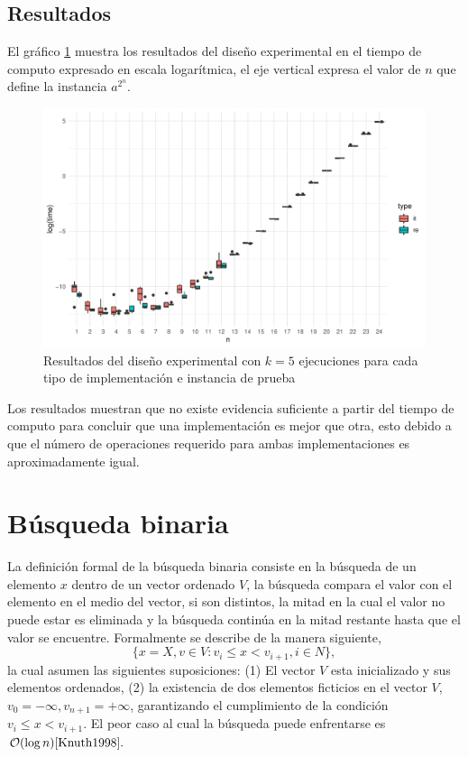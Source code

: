 \documentclass[letterpaper,11pt]{article}
\begin{document}
\subsection{Resultados}
El gráfico \ref{fig:ie} muestra los resultados del diseño experimental en el tiempo de computo expresado en escala logarítmica, el eje vertical expresa el valor de $n$ que define la instancia $a^{2^n}$.

\begin{figure}[h!]
  \includegraphics[width=\linewidth]{ie.pdf}
  \caption{Resultados del diseño experimental con $k=5$ ejecuciones para cada tipo de implementación e instancia de prueba}
  \label{fig:ie}
\end{figure}

Los resultados muestran que no existe evidencia suficiente a partir del tiempo de computo para concluir que una implementación es mejor que otra, esto debido a que el número de operaciones requerido para ambas implementaciones es aproximadamente igual.

\section{Búsqueda binaria}

La definición formal de la búsqueda binaria consiste en la búsqueda de un elemento $x$ dentro de un vector ordenado $V$,  la búsqueda compara el valor con el elemento en el medio del vector, si son distintos, la mitad en la cual el valor no puede estar es eliminada y la búsqueda continúa en la mitad restante hasta que el valor se encuentre. Formalmente se describe de la manera siguiente,
\begin{equation}
\{ x= X, v \in V: v_i \leq x < v_{i+1}, i\in N \}, 
\end{equation}
la cual asumen las siguientes suposiciones: (1) El vector $V$ esta inicializado y sus elementos ordenados, (2) la existencia de dos elementos ficticios en el vector $V$, $v_0=-\infty, v_{n+1}=+\infty$, garantizando el cumplimiento de la condición $v_i \leq x < v_{i+1}$. El peor caso al cual la búsqueda puede enfrentarse es $\mathcal{O}(\log{}n) \cite{Knuth1998}.$
\end{document}
